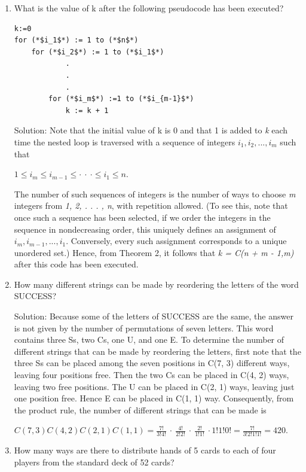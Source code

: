 \documentclass[11pt,a4paper]{book}
\begin{document}
\begin{enumerate}[label=Example~\arabic*]
\item What is the value of k after the following pseudocode has been executed?
\begin{lstlisting}[style=CStyle]
k:=0
for (*$i_1$*) := 1 to (*$n$*)
	for (*$i_2$*) := 1 to (*$i_1$*)
			.
			.
			.
		for (*$i_m$*) :=1 to (*$i_{m-1}$*)
			k := k + 1
\end{lstlisting}

Solution: Note that the initial value of k is 0 and that 1 is added to \emph{k} each time the nested loop is traversed with a sequence of integers $i_1, i_2, . . . , i_m$ such that

$1 \leq i_m \leq i_{m-1} \leq \cdot~\cdot~\cdot \leq i_1 \leq n$.

The number of such sequences of integers is the number of ways to choose \emph{m} integers from \emph{{1, 2, . . . , n}}, with repetition allowed. (To see this, note that once such a sequence has been selected, if we order the integers in the sequence in nondecreasing order, this uniquely defines an assignment of $i_m, i_{m-1}, . . . , i_1$.
Conversely, every such assignment corresponds to a unique unordered set.)
Hence, from Theorem 2, it follows that \emph{k = C(n + m - 1,m)} after this code has been executed.

\item How many different strings can be made by reordering the letters of the word SUCCESS?

Solution: Because some of the letters of SUCCESS are the same, the answer is not given by the number of permutations of seven letters.
This word contains three Ss, two Cs, one U, and one E.
To determine the number of different strings that can be made by reordering the letters, first note that the three Ss can be placed among the seven positions in C(7, 3) different ways, leaving four positions free.
Then the two Cs can be placed in C(4, 2) ways, leaving two free positions.
The U can be placed in C(2, 1) ways, leaving just one position free.
Hence E can be placed in C(1, 1) way.
Consequently, from the product rule, the number of different strings that can be made is

$C(7, 3)C(4, 2)C(2, 1)C(1, 1) = \frac{7!}{3!4!}~\cdot~\frac{4!}{2!2!}~\cdot~\frac{2!}{1!1!}~\cdot{1!}{1!0!} = \frac{7!}{3!2!1!1!}= 420$.

\item How many ways are there to distribute hands of 5 cards to each of four players from the standard deck of 52 cards?


\end{enumerate}
\end{document}

